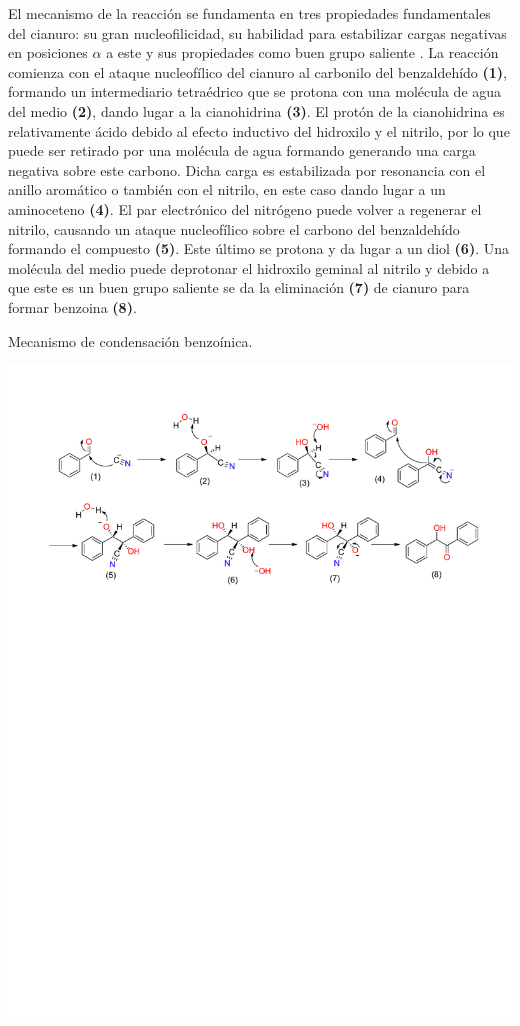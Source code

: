 \documentclass[fleqn,10pt]{SelfArx}
\begin{document}
El mecanismo de la reacción se fundamenta en tres propiedades fundamentales del cianuro: su gran nucleofilicidad, su habilidad para estabilizar cargas negativas en posiciones $\alpha$ a este y sus propiedades como buen grupo saliente \cite{cyanideioncatalyzedbenzoincondensation2014}. La reacción comienza con el ataque nucleofílico del cianuro al carbonilo del benzaldehído \textbf{(1)}, formando un intermediario tetraédrico que se protona con una molécula de agua del medio \textbf{(2)}, dando lugar a la cianohidrina \textbf{(3)}. El protón de la cianohidrina es relativamente ácido debido al efecto inductivo del hidroxilo y el nitrilo, por lo que puede ser retirado por una molécula de agua formando generando una carga negativa sobre este carbono. Dicha carga es estabilizada por resonancia con el anillo aromático o también con el nitrilo, en este caso dando lugar a un aminoceteno \textbf{(4)}. El par electrónico del nitrógeno puede volver a regenerar el nitrilo, causando un ataque nucleofílico sobre el carbono del benzaldehído formando el compuesto \textbf{(5)}. Este último se protona y da lugar a un diol \textbf{(6)}. Una molécula del medio puede deprotonar el hidroxilo geminal al nitrilo y debido a que este es un buen grupo saliente se da la eliminación \textbf{(7)} de cianuro para formar benzoina \textbf{(8)}.
\begin{scheme}[h]
	\centering
	\caption{Mecanismo de condensaci\'on benzo\'inica.}
	\includegraphics[width=\linewidth]{structures/mecanismo_benzoina.pdf}
\end{scheme}
\end{document}
